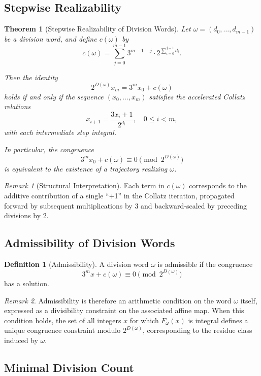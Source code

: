 \documentclass[12pt, oneside]{article}
\numberwithin{equation}{section}
\theoremstyle{definition}
\newtheorem{definition}{Definition}[section]
\theoremstyle{plain}
\newtheorem{theorem}{Theorem}[section]
\theoremstyle{remark}
\newtheorem*{remark}{Remark}
\begin{document}
\subsection{Stepwise Realizability}

\begin{theorem}[Stepwise Realizability of Division Words]
\label{thm:stepwise-realizability}
Let $\omega = (d_0,\dots,d_{m-1})$ be a division word, and define $c(\omega)$ by
\[
c(\omega)
=
\sum_{j=0}^{m-1}
3^{m-1-j}\cdot 2^{\sum_{i=0}^{j-1} d_i}.
\]

Then the identity
\[
2^{D(\omega)} x_m = 3^m x_0 + c(\omega)
\]
holds if and only if the sequence $(x_0,\dots,x_m)$ satisfies the accelerated
Collatz relations
\[
x_{i+1} = \frac{3x_i+1}{2^{d_i}}, \quad 0 \le i < m,
\]
with each intermediate step integral.

In particular, the congruence
\[
3^m x_0 + c(\omega) \equiv 0 \pmod{2^{D(\omega)}}
\]
is equivalent to the existence of a trajectory realizing $\omega$.
\end{theorem}

\begin{remark}[Structural Interpretation]
Each term in $c(\omega)$ corresponds to the additive contribution of a single
``+1'' in the Collatz iteration, propagated forward by subsequent multiplications
by $3$ and backward-scaled by preceding divisions by $2$.
\end{remark}

\subsection{Admissibility of Division Words}

\begin{definition}[Admissibility]
\label{def:admissible-division-word}
A division word $\omega$ is admissible if the congruence
\[
3^m x + c(\omega) \equiv 0 \pmod{2^{D(\omega)}}
\]
has a solution.
\end{definition}
\begin{remark}
Admissibility is therefore an arithmetic condition on the word $\omega$
itself, expressed as a divisibility constraint on the associated affine
map. When this condition holds, the set of all integers $x$ for which
$F_\omega(x)$ is integral defines a unique congruence constraint modulo
$2^{D(\omega)}$, corresponding to the residue class induced by $\omega$.
\end{remark}

\subsection{Minimal Division Count}
\end{document}
